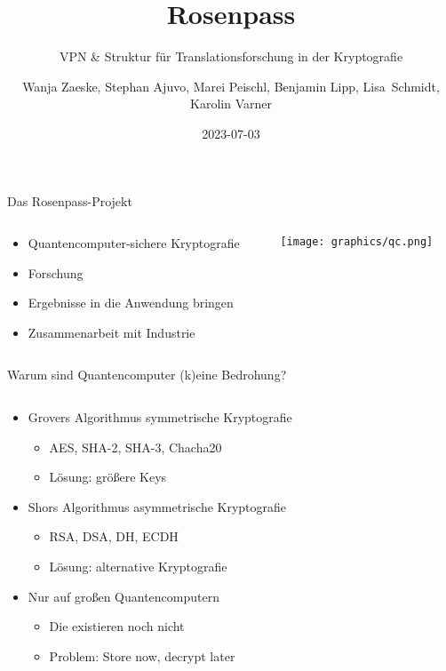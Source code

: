\documentclass{rosenpass-beamer}
\title{Rosenpass}
\subtitle{VPN \& Struktur für Translationsforschung in der Kryptografie}
\author{
Wanja Zaeske, Stephan Ajuvo, Marei Peischl, Benjamin Lipp, Lisa~Schmidt, Karolin Varner
}
\institute{\url{https://rosenpass.eu}}
\date{2023-07-03}
\begin{document}
\maketitle

\begin{frame}{Das Rosenpass-Projekt}
\begin{columns}[c,onlytextwidth]
\begin{column}{.6\textwidth}
\begin{itemize}
  \item Quantencomputer-sichere Kryptografie
  \item Forschung
  \item Ergebnisse in die Anwendung bringen
  \item Zusammenarbeit mit Industrie
\end{itemize}
\end{column}
\begin{column}{.4\textwidth}
\centering
  \texttt{[image: graphics/qc.png]}
\end{column}
\end{columns}
\end{frame}

\begin{frame}{Warum sind Quantencomputer (k)eine Bedrohung?}
\begin{columns}[b]
\begin{column}{.75\textwidth}
\begin{itemize}
  \item Grovers Algorithmus  symmetrische Kryptografie
  \begin{itemize}
    \item AES, SHA-2, SHA-3, Chacha20
    \item Lösung: größere Keys
  \end{itemize}
  \item Shors Algorithmus  asymmetrische Kryptografie
  \begin{itemize}
    \item RSA, DSA, DH, ECDH
    \item Lösung: alternative Kryptografie
  \end{itemize}
  \item  Nur auf großen Quantencomputern
  \begin{itemize}
    \item Die existieren noch nicht
    \item Problem: Store now, decrypt later
  \end{itemize}
\end{itemize}
\end{column}
\begin{column}{.25\textwidth}
%
\par
{}
\end{column}
\end{columns}
\end{frame}
\end{document}
